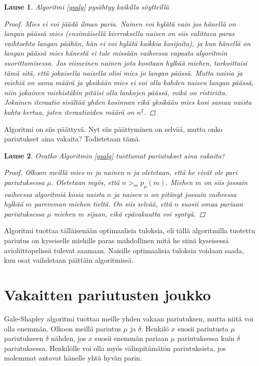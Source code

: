 \documentclass[finnish]{tktltiki2}
\newtheorem{lau}{Lause}
\theoremstyle{definition}
\theoremstyle{remark}
\begin{document}
\begin{lau}
Algoritmi \ref{gsalg} pysähtyy kaikilla söytteillä
\begin{proof}
Mies ei voi jäädä ilman paria. Nainen voi hylätä vain jos hänellä on langan päässä mies (ensimäisellä kierroksella naisen on siis valittava paras vaihtoehto langan päähän, hän ei voi hylätä kaikkia kosijoita), ja kun hänellä on langan päässä mies hänestä ei tule missään vaiheessa vapaata algoritmin suorittamisessa.
Jos viimeinen nainen jota kositaan hylkää miehen, tarkoittaisi tämä sitä, että jokaisella naisella olisi mies jo langan päässä. Mutta naisia ja miehiä on sama määrä ja yksikään mies ei voi olla kahden naisen langan päässä, niin jokainen miehistäkin pitäisi olla lankojen päässä, mikä on ristiriita.
Jokainen iteraatio sisältää yhden kosinnan eikä yksikään mies kosi samaa naista kahta kertaa, joten iteraatioiden määrä on $n^2$.
\end{proof}
\end{lau}
Algoritmi on siis päättyvä. Nyt siis päättyminen on selvää, mutta onko pariutukset aina vakaita?
Todistetaan tämä.
\begin{lau}
Ovatko Algoritmin \ref{gsalg} tuottamat pariutukset aina vakaita?
\begin{proof}\cite[p. 588]{gale62a}
Olkoon meillä mies $m$ ja nainen $n$ ja oletetaan, että he eivät ole pari pariutuksessa $\mu$. Oletetaan myös, että $n >_{m} p_{\mu}(m)$. Miehen $m$ on siis jossain vaiheessa algoritmiä kosia naista $n$ ja naisen $n$ on pitänyt jossain vaiheessa hylkää $m$ paremman miehen tieltä. On siis selvää, että $n$ suosii omaa pariaan pariutuksessa $\mu$ miehen $m$ sijaan, eikä epävakautta voi syntyä.
\end{proof}
\end{lau}
Algoritmi tuottaa tälläisenään optimaalisia tuloksia, eli tällä algoritmilla tuotettu pariutus on kyseiselle miehille paras mahdollinen mitä he siinä kyseisessä avioliittopelissä tulevat saamaan.
Naisille optimaalisia tuloksia voidaan saada, kun osat vaihdetaan päittäin algoritmissä.

\section{Vakaitten pariutusten joukko}
Gale-Shapley algoritmi tuottaa meille yhden vakaan pariutuksen, mutta niitä voi olla enemmän.
Olkoon meillä pariutus $\mu$ ja $\delta$. Henkilö $x$ suosii pariutusta $\mu$ pariutukseen $\delta$ nähden, jos $x$ suosii enemmän pariaan $\mu$ pariutuksessa kuin $\delta$ pariutuksessa. Henkilölle voi olla myös välinpitämätön pariutuksista, jos molemmat antavat hänelle yhtä hyvän parin.
\end{document}
